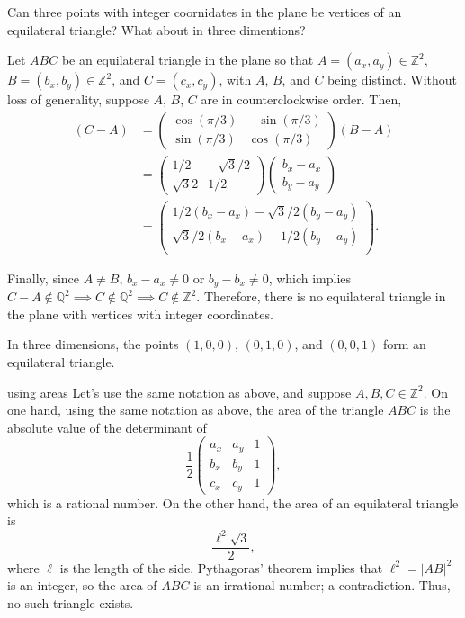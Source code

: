 
\begin{prob}{}{}
	Can three points with integer coornidates in the plane be vertices of an equilateral triangle? What about in three dimentions?
\end{prob}

\begin{sol}{}{}
	Let \(ABC\) be an equilateral triangle in the plane so that \(A = (a_x, a_y) \in \mathbb{Z}^2\), \(B = (b_x, b_y) \in \mathbb{Z}^2\), and \(C = (c_x, c_y)\), with \(A\), \(B\), and \(C\) being distinct. Without loss of generality, suppose \(A\), \(B\), \(C\) are in counterclockwise order. Then,
	\begin{align*}
		(C - A) &=
		\begin{pmatrix}
			\cos(\pi/3) & -\sin(\pi/3) \\
			\sin(\pi/3) & \cos(\pi/3) 
		\end{pmatrix}
		(B - A) \\
		&=
		\begin{pmatrix}
			1/2 & -\sqrt{3}/2 \\
			\sqrt{3}{2} & 1/2 
		\end{pmatrix}
		\begin{pmatrix}
			b_x - a_x \\
			b_y - a_y
		\end{pmatrix} \\
		&=
		\begin{pmatrix}
			1/2(b_x - a_x) - \sqrt{3}/{2}(b_y-a_y) \\
			\sqrt{3}/2(b_x - a_x) + 1/2(b_y-a_y) \\
		\end{pmatrix}.
	\end{align*}

	Finally, since \(A \neq B\), \(b_x - a_x \neq 0\) or \(b_y - b_x \neq 0\), which implies \(C - A \notin \mathbb{Q}^2 \implies C \notin \mathbb{Q}^2 \implies C \notin \mathbb{Z}^2\). Therefore, there is no equilateral triangle in the plane with vertices with integer coordinates.

	In three dimensions, the points \((1, 0, 0)\), \((0, 1, 0)\), and \((0, 0, 1)\) form an equilateral triangle.
\end{sol}

\begin{sol}{using areas}{}
	Let's use the same notation as above, and suppose \(A, B, C \in \mathbb{Z}^2\).
	On one hand, using the same notation as above, the area of the triangle \(ABC\) is the absolute value of the determinant of \[
		\frac{1}{2}\begin{pmatrix}
			a_x&a_y&1 \\
			b_x&b_y&1 \\
			c_x&c_y&1
		\end{pmatrix},
	\]
	which is a rational number.
	On the other hand, the area of an equilateral triangle is \[
		\frac{\ell^2 \sqrt{3}}{2},
	\]
	where \(\ell\) is the length of the side. Pythagoras' theorem implies that \(\ell^2 = |AB|^2\) is an integer, so the area of \(ABC\) is an irrational number; a contradiction. Thus, no such triangle exists.
\end{sol}

